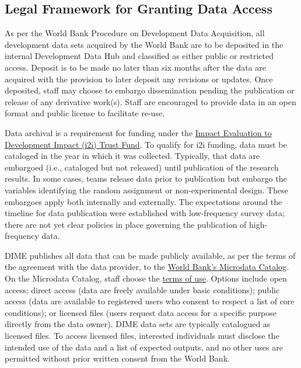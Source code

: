 \hypertarget{legal-framework-for-granting-data-access-6}{%
\subsection{Legal Framework for Granting Data Access}\label{legal-framework-for-granting-data-access-6}}

As per the World Bank Procedure on Development Data Acquisition, all development data sets acquired by the World Bank are to be deposited in the internal Development Data Hub and classified as either public or restricted access. Deposit is to be made no later than six months after the data are acquired with the provision to later deposit any revisions or updates. Once deposited, staff may choose to embargo dissemination pending the publication or release of any derivative work(s). Staff are encouraged to provide data in an open format and public license to facilitate re-use.

Data archival is a requirement for funding under the \href{https://www.worldbank.org/en/research/dime/brief/i2i-fund}{Impact Evaluation to Development Impact (i2i) Trust Fund}. To qualify for i2i funding, data must be cataloged in the year in which it was collected. Typically, that data are embargoed (i.e., cataloged but not released) until publication of the research results. In some cases, teams release data prior to publication but embargo the variables identifying the random assignment or non-experimental design. These embargoes apply both internally and externally. The expectations around the timeline for data publication were established with low-frequency survey data; there are not yet clear policies in place governing the publication of high-frequency data.

DIME publishes all data that can be made publicly available, as per the terms of the agreement with the data provider, to the \href{https://microdata.worldbank.org/index.php/home}{World Bank's Microdata Catalog}. On the Microdata Catalog, staff choose the \href{https://microdata.worldbank.org/index.php/terms-of-use}{terms of use}. Options include open access; direct access (data are freely available under basic conditions); public access (data are available to registered users who consent to respect a list of core conditions); or licensed files (users request data access for a specific purpose directly from the data owner). DIME data sets are typically catalogued as licensed files. To access licensed files, interested individuals must disclose the intended use of the data and a list of expected outputs, and no other uses are permitted without prior written consent from the World Bank.

